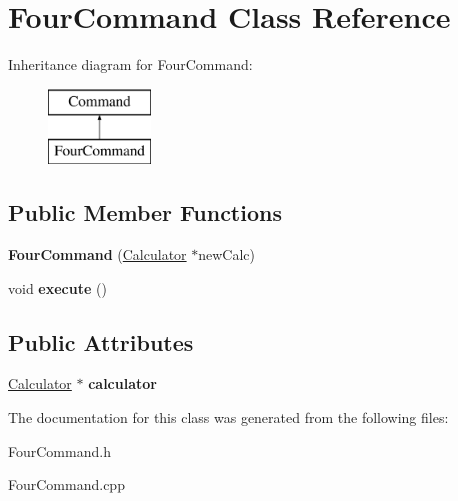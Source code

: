 \hypertarget{class_four_command}{}\section{Four\+Command Class Reference}
\label{class_four_command}
Inheritance diagram for Four\+Command\+:\begin{figure}[H]
\begin{center}
\leavevmode
\includegraphics[height=2.000000cm]{class_four_command}
\end{center}
\end{figure}
\subsection*{Public Member Functions}
\begin{DoxyCompactItemize}
\item 
\hypertarget{class_four_command_acba8d0c8c5e4951816c271015f22095e}{}{\bfseries Four\+Command} (\hyperlink{class_calculator}{Calculator} $\ast$new\+Calc)\label{class_four_command_acba8d0c8c5e4951816c271015f22095e}

\item 
\hypertarget{class_four_command_abc26a6d79d1897ab73b963f7737315ef}{}void {\bfseries execute} ()\label{class_four_command_abc26a6d79d1897ab73b963f7737315ef}

\end{DoxyCompactItemize}
\subsection*{Public Attributes}
\begin{DoxyCompactItemize}
\item 
\hypertarget{class_four_command_a3a411398976791c35d4a3c131f592116}{}\hyperlink{class_calculator}{Calculator} $\ast$ {\bfseries calculator}\label{class_four_command_a3a411398976791c35d4a3c131f592116}

\end{DoxyCompactItemize}


The documentation for this class was generated from the following files\+:\begin{DoxyCompactItemize}
\item 
Four\+Command.\+h\item 
Four\+Command.\+cpp\end{DoxyCompactItemize}
